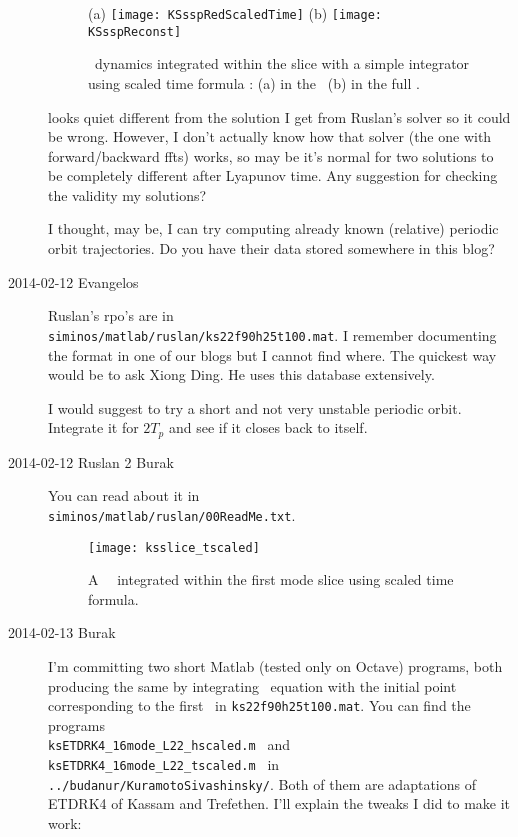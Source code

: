 \begin{description}
\begin{figure}%
 \centering
 (a) \texttt{[image: KSsspRedScaledTime]}
 (b) \texttt{[image: KSsspReconst]}
\caption{\KS\ dynamics integrated within the slice with a simple integrator
using scaled time formula : (a) in the \slicePlane\
(b) in the full \statesp.}
\label{fig:KSsspRedScaledTime}
\end{figure}

 looks quiet different from the solution
I get from Ruslan's solver so it could be wrong. However, I don't actually
know how that solver (the one with forward/backward ffts) works, so may be
it's normal for two solutions to be completely different after Lyapunov time.
Any suggestion for checking the validity my solutions?

I thought, may be, I can try computing already known (relative) periodic
orbit trajectories. Do you have their data stored somewhere in this blog?

\item[2014-02-12 Evangelos] Ruslan's rpo's are in
\\
\texttt{siminos/matlab/ruslan/ks22f90h25t100.mat}.
I remember documenting the format in one of our blogs but I cannot find where.
The quickest way would be to ask Xiong Ding. He uses this database extensively.

I would suggest to try a short and not very unstable periodic orbit. Integrate it for $2T_p$ and
see if it closes back to itself.

\item[2014-02-12 Ruslan 2 Burak] You can read about it in
\\
\texttt{siminos/matlab/ruslan/00ReadMe.txt}.

\begin{figure}%
 \centering
  \texttt{[image: ksslice\_tscaled]}
\caption{A \KS\ \rpo\ integrated within the first mode slice using scaled
	  time formula.}
\label{fig:ksslice_tscaled}
\end{figure}

\item[2014-02-13 Burak] I'm committing two short Matlab (tested only on Octave)
programs, both producing the same \reffig{fig:ksslice_tscaled} by
integrating \KS\ equation with the initial point corresponding to the first
\rpo\ in  \texttt{ks22f90h25t100.mat}. You can find the programs
\\
\texttt{ksETDRK4\_16mode\_L22\_hscaled.m } and
\\
\texttt{ksETDRK4\_16mode\_L22\_tscaled.m }
in
\\
\texttt{../budanur/KuramotoSivashinsky/}.
Both of them are adaptations of ETDRK4 of
{Kassam and Trefethen}.
I'll explain the tweaks I did to make it work:


\end{description}
